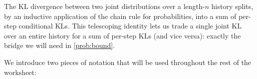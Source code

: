 \documentclass[fontsize=11pt, parskip=half]{scrartcl}
\begin{document}
%
%

The KL divergence between two joint distributions over a length-$n$ history splits, by an inductive application of the chain rule for probabilities, into a sum of per-step conditional KLs. This telescoping identity lets us trade a single joint KL over an entire history for a sum of per-step KLs (and vice versa): exactly the bridge we will need in \cref{prob:bound}.

We introduce two pieces of notation that will be used throughout the rest of the worksheet:
\end{document}

